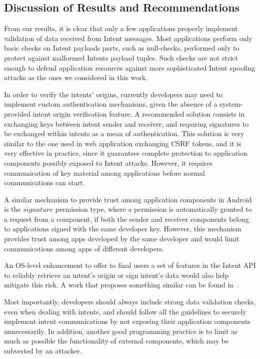 \subsection{Discussion of Results and Recommendations}

From our results, it is clear that only a few applications properly implement validation of data received from Intent messages. Most applications perform only basic checks on Intent payloads parts, such as null-checks, performed only to protect against malformed Intents payload tuples. Such checks are not strict enough to defend application resources against more sophisticated Intent spoofing attacks as the ones we considered in this work.

In order to verify the intents' origins, currently developers may need to implement custom authentication mechanisms, given the absence of a system-provided intent origin verification feature. A recommended solution consists in exchanging keys between intent sender and receiver, and requiring signatures to be exchanged within intents as a mean of authentication. This solution is very similar to the one used in web application exchanging CSRF tokens, and it is very effective in practice, since it guarantees complete protection to application components possibly exposed to Intent attacks. However, it requires communication of key material among applications before normal communications can start.

{\color{orange}
A similar mechanism to provide trust among application components in Android is the $signature$ permission type, where a permission is automatically granted to a request from a component, if both the sender and receiver components belong to applications signed with the same developer key. However, this mechanism provides trust among apps developed by the same developer and would limit communications among apps of different developers. 
} 

An OS-level enhancement to offer to final users a set of features
in the Intent API to reliably retrieve an intent's origin or sign intent's data would also help mitigate this risk. A work that proposes something similar can be found in~\cite{quire2011}.

Most importantly, developers should always include strong data validation checks, even when dealing with intents, and should follow all the guidelines to securely implement intent communications by not exposing their application components unnecessarily. { \color{orange} In addition, another good programming practice is to limit as much as possible the functionality of external components, which may be subverted by an attacker. } 


